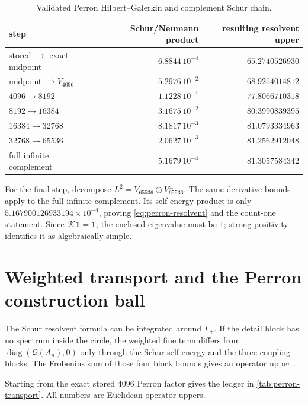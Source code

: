\documentclass[11pt]{article}
\theoremstyle{definition}
\theoremstyle{remark}
\newcommand{\cK}{\mathcal K}
\newcommand{\cQ}{\mathcal Q}
\begin{document}
\begin{table}[H]
\centering
\caption{Validated Perron Hilbert--Galerkin and complement Schur chain.}
\label{tab:perron-chain}
\begin{tabular}{@{}lrr@{}}
\toprule
step & Schur/Neumann product & resulting resolvent upper\\
\midrule
stored $\to$ exact midpoint & $6.8844\,10^{-4}$ & $65.2740526930$\\
midpoint $\to V_{4096}$ & $5.2976\,10^{-2}$ & $68.9254014812$\\
$4096\to8192$ & $1.1228\,10^{-1}$ & $77.8066710318$\\
$8192\to16384$ & $3.1675\,10^{-2}$ & $80.3990839395$\\
$16384\to32768$ & $8.1817\,10^{-3}$ & $81.0793334963$\\
$32768\to65536$ & $2.0627\,10^{-3}$ & $81.2562912048$\\
full infinite complement & $5.1679\,10^{-4}$ & $81.3057584342$\\
\bottomrule
\end{tabular}
\end{table}

For the final step, decompose
$L^2=V_{65536}\oplus V_{65536}^\perp$.  The same derivative bounds apply to
the full infinite complement.  Its self-energy product is only
$5.167900126933194\times10^{-4}$, proving
\eqref{eq:perron-resolvent} and the count-one statement.  Since
$\cK\mathbf1=\mathbf1$, the enclosed eigenvalue must be $1$; strong
positivity identifies it as algebraically simple.

\section{Weighted transport and the Perron construction ball}
\label{sec:perron-transport}

The Schur resolvent formula can be integrated around $\Gamma_+$.  If the
detail block has no spectrum inside the circle, the weighted fine term
differs from $\operatorname{diag}(\cQ(A_n),0)$ only through the Schur
self-energy and the three coupling blocks.  The Frobenius sum of those four
block bounds gives an operator upper
\citep{WangParityKernel2026}.

Starting from the exact stored $4096$ Perron factor gives the ledger in
\cref{tab:perron-transport}.  All numbers are Euclidean operator uppers.
\end{document}
